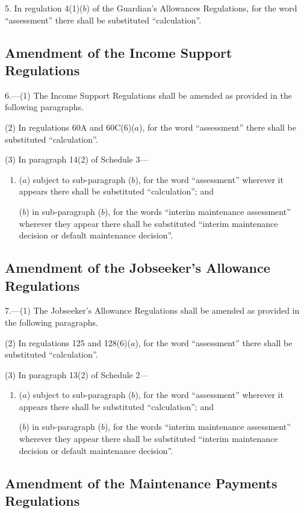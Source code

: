 \documentclass[12pt,a4paper]{article}
\begin{document}
5.  In regulation 4(1)($b$)  of the Guardian’s Allowances Regulations, for the word “assessment” there shall be substituted “calculation”.

\subsection[6. Amendment of the Income Support Regulations]{Amendment of the Income Support Regulations}

6.---(1)  The Income Support Regulations shall be amended as provided in the following paragraphs.

(2) In regulations 60A and 60C(6)($a$), for the word “assessment” there shall be substituted “calculation”.

(3) In paragraph 14(2) of Schedule 3—
\begin{enumerate}\item[]
($a$) subject to sub-paragraph ($b$), for the word “assessment” wherever it appears there shall be substituted “calculation”; and

($b$) in sub-paragraph ($b$), for the words “interim maintenance assessment” wherever they appear there shall be substituted “interim maintenance decision or default maintenance decision”.
\end{enumerate}

\subsection[7. Amendment of the Jobseeker’s Allowance Regulations]{Amendment of the Jobseeker’s Allowance Regulations}

7.---(1)  The Jobseeker’s Allowance Regulations shall be amended as provided in the following paragraphs.

(2) In regulations 125 and 128(6)($a$), for the word “assessment” there shall be substituted “calculation”.

(3) In paragraph 13(2) of Schedule 2—
\begin{enumerate}\item[]
($a$) subject to sub-paragraph ($b$), for the word “assessment” wherever it appears there shall be substituted “calculation”; and

($b$) in sub-paragraph ($b$), for the words “interim maintenance assessment” wherever they appear there shall be substituted “interim maintenance decision or default maintenance decision”.
\end{enumerate}

\subsection[8. Amendment of the Maintenance Payments Regulations]{Amendment of the Maintenance Payments Regulations}
\end{document}
